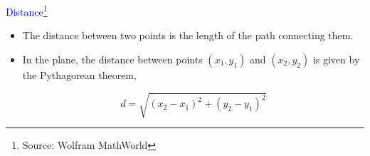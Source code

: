 \documentclass[landscape]{slides}
\begin{document}
\begin{slide}

\textcolor{blue}{\Large{Distance}\footnote{Source: Wolfram MathWorld}}

\begin{itemize}

\item{The distance between two points is the length of the path connecting them.}

\item In the plane, the distance between points $(x_1, y_1)$ and $(x_2, y_2)$ is given by the Pythagorean theorem,

$$d=\sqrt{(x_2-x_1)^2+(y_2-y_1)^2}$$

\end{itemize}

\end{slide}
\end{document}
